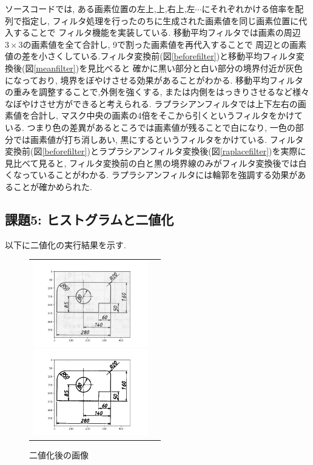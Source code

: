 \documentclass[a4paper,11pt,uplatex, titlepage]{jsarticle}
\begin{document}
ソースコードでは, ある画素位置の左上,上,右上,左$\cdots$にそれぞれかける倍率を配列で指定し, フィルタ処理を行ったのちに生成された画素値を同じ画素位置に代入することで
フィルタ機能を実装している.
移動平均フィルタでは画素の周辺$3\times3$の画素値を全て合計し, 9で割った画素値を再代入することで
周辺との画素値の差を小さくしている.フィルタ変換前(図\ref{beforefilter})と移動平均フィルタ変換後(図\ref{meanfilter})を見比べると
確かに黒い部分と白い部分の境界付近が灰色になっており, 境界をぼやけさせる効果があることがわかる.
移動平均フィルタの重みを調整することで,外側を強くする, または内側をはっきりさせるなど様々なぼやけさせ方ができると考えられる.
ラプラシアンフィルタでは上下左右の画素値を合計し, マスク中央の画素の4倍をそこから引くというフィルタをかけている.
つまり色の差異があるところでは画素値が残ることで白になり, 一色の部分では画素値が打ち消しあい, 黒にするというフィルタをかけている.
フィルタ変換前(図\ref{beforefilter})とラプラシアンフィルタ変換後(図\ref{raplacefilter})を実際に見比べて見ると, フィルタ変換前の白と黒の境界線のみがフィルタ変換後では白くなっていることがわかる.
ラプラシアンフィルタには輪郭を強調する効果があることが確かめられた.

\subsection{課題5: ヒストグラムと二値化}
以下に二値化の実行結果を示す.

\begin{figure}[H]
  \begin{tabular}{cc}
    \begin{minipage}{0.5\hsize}
      \begin{center}
        \includegraphics[width = 5cm]{pic/kadai5.png}
        \caption{二値化前の画像}
        \label{beforedivide}
      \end{center}
    \end{minipage}

    \begin{minipage}{0.5\hsize}
      \begin{center}
        \includegraphics[width = 5cm]{pic/kadai5_200.png}
        \caption{二値化後の画像}
        \label{afterdivide}
      \end{center}
    \end{minipage}
  \end{tabular}
\end{figure}
\end{document}
